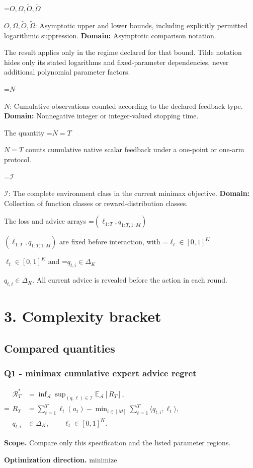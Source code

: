 \documentclass[10pt,a4paper]{article}
\newcommand{\AtlasMath}[1]{\par\begingroup\centering\setbox0=\hbox{$\displaystyle #1$}\ifdim\wd0>1.4\linewidth\typeout{ATLAS WIDE FORMULA: \the\wd0}\fi\ifdim\wd0>\linewidth\resizebox{\linewidth}{!}{\box0}\else\box0\fi\par\endgroup}
\newcommand{\AtlasInlineMath}[1]{\begingroup\setbox0=\hbox{$#1$}\ifdim\wd0>.4\linewidth\endgroup\AtlasMath{#1}\else\endgroup$#1$\fi}
\begin{document}
\AtlasInlineMath{O,\Omega,\widetilde O,\widetilde\Omega}: Asymptotic upper and lower bounds, including explicitly permitted logarithmic suppression. \textbf{Domain:} Asymptotic comparison notation.

The result applies only in the regime declared for that bound. Tilde notation hides only its stated logarithms and fixed-parameter dependencies, never additional polynomial parameter factors.

\AtlasInlineMath{N}: Cumulative observations counted according to the declared feedback type. \textbf{Domain:} Nonnegative integer or integer-valued stopping time.

The quantity \AtlasInlineMath{N=T} counts cumulative native scalar feedback under a one-point or one-arm protocol.

\AtlasInlineMath{\mathcal I}: The complete environment class in the current minimax objective. \textbf{Domain:} Collection of function classes or reward-distribution classes.

The loss and advice arrays \AtlasInlineMath{(\ell_{1:T},q_{1:T,1:M})} are fixed before interaction, with \AtlasInlineMath{\ell_t\in[0,1]^K} and \AtlasInlineMath{q_{t,i}\in\Delta_K}. All current advice is revealed before the action in each round.

\section{3. Complexity bracket}
\subsection{Compared quantities}
\subsubsection{Q1 - minimax cumulative expert advice regret}
\AtlasMath{\begin{aligned}\mathcal R_T^*&=\inf_{\mathcal A}\sup_{(q,\ell)\in\mathcal I}\mathbb E_{\mathcal A}[R_T],\\ R_T&=\sum_{t=1}^T\ell_t(a_t)-\min_{i\in[M]}\sum_{t=1}^T\langle q_{t,i},\ell_t\rangle,\\ q_{t,i}&\in\Delta_K,\qquad\ell_t\in[0,1]^K.\end{aligned}}
\textbf{Scope.} Compare only this specification and the listed parameter regions.

\textbf{Optimization direction.} minimize
\end{document}
